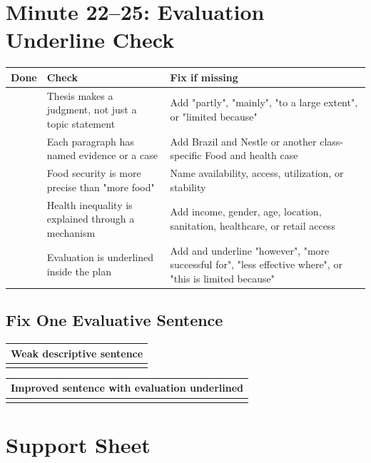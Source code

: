 \documentclass[11pt,a4paper]{article}
\newcommand{\todobox}{\fbox{\rule{0pt}{0.8em}\rule{0.8em}{0pt}}}
\begin{document}
\section{Minute 22--25: Evaluation Underline Check}

\begin{tabularx}{\textwidth}{L{0.1\textwidth}Y Y}
\toprule
\textbf{Done} & \textbf{Check} & \textbf{Fix if missing} \\
\midrule
\todobox & Thesis makes a judgment, not just a topic statement & Add
"partly", "mainly", "to a large extent", or "limited because" \\
\todobox & Each paragraph has named evidence or a case & Add Brazil and Nestle
or another class-specific Food and health case \\
\todobox & Food security is more precise than "more food" & Name availability,
access, utilization, or stability \\
\todobox & Health inequality is explained through a mechanism & Add income,
gender, age, location, sanitation, healthcare, or retail access \\
\todobox & Evaluation is underlined inside the plan & Add and underline
"however", "more successful for", "less effective where", or "this is limited
because" \\
\bottomrule
\end{tabularx}

\subsection{Fix One Evaluative Sentence}

\begin{tabularx}{\textwidth}{Y}
\toprule
\textbf{Weak descriptive sentence} \\
\midrule
\rule{0pt}{1.25cm} \\
\bottomrule
\end{tabularx}

\vspace{0.65em}

\begin{tabularx}{\textwidth}{Y}
\toprule
\textbf{Improved sentence with evaluation underlined} \\
\midrule
\rule{0pt}{1.25cm} \\
\bottomrule
\end{tabularx}

\newpage

\section{Support Sheet}
\end{document}
